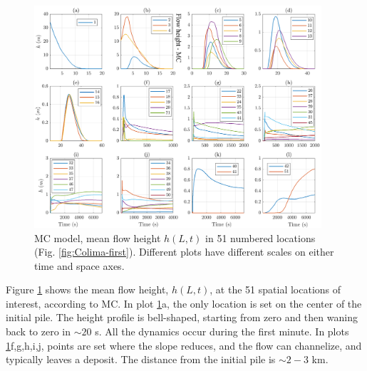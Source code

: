 \documentclass{article}
\begin{document}
\begin{figure}[H]
         \centering
        \includegraphics[width=0.95\textwidth]{HeightMC_BAF.png}
        \caption{MC model, mean flow height $h(L,t)$ in 51 numbered locations (Fig. \ref{fig:Colima-first}). Different plots have different scales on either time and space axes.}
        \label{fig:BAF-H-MC}
\end{figure}
Figure \ref{fig:BAF-H-MC} shows the mean flow height, $h(L,t)$, at the 51 spatial locations of interest, according to MC. In plot \ref{fig:BAF-H-MC}a, the only location is set on the center of the initial pile. %
The height profile is bell-shaped, starting from zero and then waning back to zero in $\sim 20$ s. All the dynamics occur during the first minute. In plots \ref{fig:BAF-H-MC}f,g,h,i,j, points are set where the slope reduces, and the flow can channelize, and typically leaves a deposit. The distance from the initial pile is $\sim 2-3$ km. %
\end{document}
